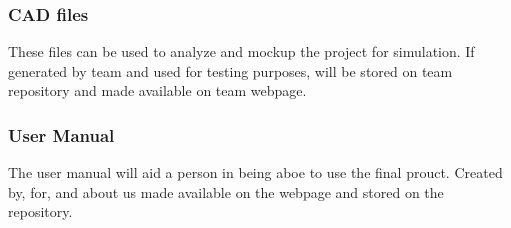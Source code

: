 \subsubsection{CAD files}
These files can be used to analyze and mockup the project for simulation. If generated by team and used for testing purposes, will be stored on team repository and made available on team webpage.

\subsubsection{User Manual}
The user manual will aid a person in being aboe to use the final prouct. Created by, for, and about us made available on the webpage and stored on the repository.